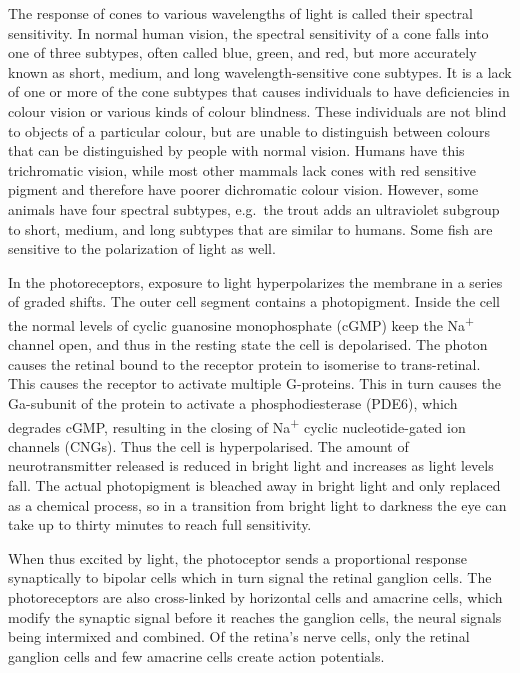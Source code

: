 The response of cones to various wavelengths of light is called their spectral sensitivity. In normal human vision, the spectral sensitivity of a cone falls into one of three subtypes, often called blue, green, and red, but more accurately known as short, medium, and long wavelength-sensitive cone subtypes. It is a lack of one or more of the cone subtypes that causes individuals to have deficiencies in colour vision or various kinds of colour blindness. These individuals are not blind to objects of a particular colour, but are unable to distinguish between colours that can be distinguished by people with normal vision. Humans have this trichromatic vision, while most other mammals lack cones with red sensitive pigment and therefore have poorer dichromatic colour vision. However, some animals have four spectral subtypes, e.g.~the trout adds an ultraviolet subgroup to short, medium, and long subtypes that are similar to humans. Some fish are sensitive to the polarization of light as well.

In the photoreceptors, exposure to light hyperpolarizes the membrane in a series of graded shifts. The outer cell segment contains a photopigment. Inside the cell the normal levels of cyclic guanosine monophosphate (cGMP) keep the Na\textsuperscript{+} channel open, and thus in the resting state the cell is depolarised. The photon causes the retinal bound to the receptor protein to isomerise to trans-retinal. This causes the receptor to activate multiple G-proteins. This in turn causes the Ga-subunit of the protein to activate a phosphodiesterase (PDE6), which degrades cGMP, resulting in the closing of Na\textsuperscript{+} cyclic nucleotide-gated ion channels (CNGs). Thus the cell is hyperpolarised. The amount of neurotransmitter released is reduced in bright light and increases as light levels fall. The actual photopigment is bleached away in bright light and only replaced as a chemical process, so in a transition from bright light to darkness the eye can take up to thirty minutes to reach full sensitivity.

When thus excited by light, the photoceptor sends a proportional response synaptically to bipolar cells which in turn signal the retinal ganglion cells. The photoreceptors are also cross-linked by horizontal cells and amacrine cells, which modify the synaptic signal before it reaches the ganglion cells, the neural signals being intermixed and combined. Of the retina's nerve cells, only the retinal ganglion cells and few amacrine cells create action potentials.

